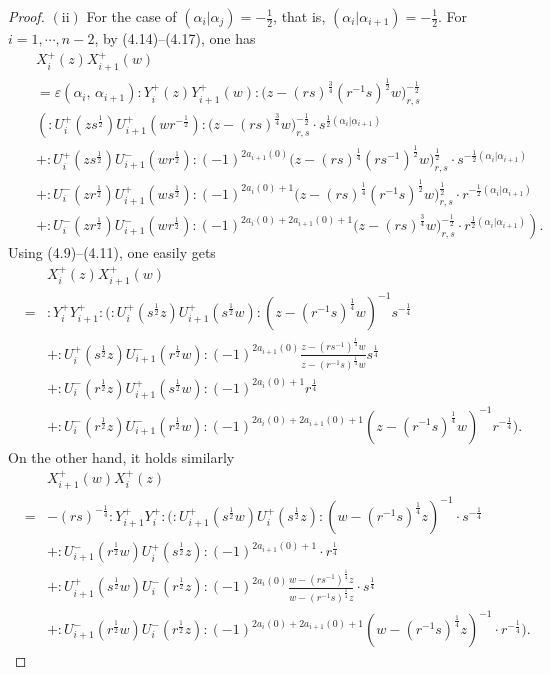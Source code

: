 \documentclass{amsproc}
\theoremstyle{remark}
\numberwithin{equation}{section}
\begin{document}
\begin{proof}
$(\text{ii})$ For the case of $(\alpha_i|\alpha_j)=-\frac{1}{2}$, that is, $(\alpha_i|\alpha_{i+1})=-\frac{1}{2}$.
 For $i=1, \cdots, n-2$, by (4.14)--(4.17), one has
  \begin{eqnarray*}
&&X^+_i(z)X^+_{i+1}(w)\\
&&= \varepsilon(\alpha_{i},\,\alpha_{i+1}):Y_i^+(z)Y_{i+1}^+(w):\big(z-(rs)^{\frac{3}{4}}(r^{-1}s)^{\frac{1}{2}}w\big)_{r,s}^{-\frac{1}{2}}\\
 && \left(:U_i^+(zs^{\frac{1}{2}})U^+_{i+1}(wr^{-\frac{1}{2}}):\big(z-(rs)^{\frac{3}{4}}w\big)_{r,s}^{-\frac{1}{2}}
 \cdot s^{\frac{1}{2}(\alpha_i|\alpha_{i+1})} \right.\\
&& +:U_i^+(zs^{\frac{1}{2}})U_{i+1}^-(wr^{\frac{1}{2}}):(-1)^{2a_{i+1}(0)} \big(z-(rs)^{\frac{1}{4}}(rs^{-1})^{\frac{1}{2}}w\big)_{r,s}^{\frac{1}{2}}\cdot s^{-\frac{1}{2}(\alpha_i|\alpha_{i+1})}\\
 &&  +:U_i^-(zr^{\frac{1}{2}})U_{i+1}^+(ws^{\frac{1}{2}}):(-1)^{2a_{i}(0)+1}
 \big(z-(rs)^{\frac{1}{4}}(r^{-1}s)^{\frac{1}{2}}w\big)_{r,s}^{\frac{1}{2}}\cdot r^{-\frac{1}{2}(\alpha_i|\alpha_{i+1})}\\
&&  \left.+
:U_i^-(zr^{\frac{1}{2}})U_{i+1}^-(wr^{\frac{1}{2}}):(-1)^{2a_i(0)+2a_{i+1}(0)+1}
\big(z-(rs)^{\frac{3}{4}}w\big)_{r,s}^{-\frac{1}{2}}\cdot r^{\frac{1}{2}(\alpha_i|\alpha_{i+1})} \right).
\end{eqnarray*}
Using (4.9)--(4.11), one easily gets
\begin{eqnarray*}
&&X^+_i(z)X^+_{i+1}(w)\\
&=& :Y_i^+Y_{i+1}^+:
\big(:U_i^+(s^{\frac{1}{2}}z)U^+_{i+1}(s^{\frac{1}{2}}w):(z-(r^{-1}s)^{\frac{1}{4}}w)^{-1}s^{-\frac{1}{4}}\\
&&+:U_{i}^+(s^{\frac{1}{2}}z)U_{i+1}^-(r^{\frac{1}{2}}w):(-1)^{2a_{i+1}(0)}
\frac{z-(rs^{-1})^{\frac{1}{4}}w}{z-(r^{-1}s)^{\frac{1}{4}}w}s^{\frac{1}{4}}\\
&&+:U_i^-(r^{\frac{1}{2}}z)U^+_{i+1}(s^{\frac{1}{2}}w):(-1)^{2a_{i}(0)+1}r^{\frac{1}{4}}\\
&&+ :U_i^-(r^{\frac{1}{2}}z)U_{i+1}^-(r^{\frac{1}{2}}w):(-1)^{2a_i(0)+2a_{i+1}(0)+1}
(z-(r^{-1}s)^{\frac{1}{4}}w)^{-1}r^{-\frac{1}{4}}\big).
\end{eqnarray*}
On the other hand, it holds similarly
\begin{eqnarray*}
&&X^+_{i+1}(w)X^+_i(z)\\
&=& -(rs)^{-\frac{1}{4}}:Y_{i+1}^+Y_i^+:
\big(:U^+_{i+1}(s^{\frac{1}{2}}w)U^+_i(s^{\frac{1}{2}}z):(w-(r^{-1}s)^{\frac{1}{4}}z)^{-1}\cdot s^{-\frac{1}{4}}\\
&&+:U_{i+1}^-(r^{\frac{1}{2}}w)U_{i}^+(s^{\frac{1}{2}}z):(-1)^{2a_{i+1}(0)+1}\cdot r^{\frac{1}{4}}\\
&&+:U^+_{i+1}(s^{\frac{1}{2}}w)U_i^-(r^{\frac{1}{2}}z):
(-1)^{2a_{i}(0)}\frac{w-(rs^{-1})^{\frac{1}{4}}z}{w-(r^{-1}s)^{\frac{1}{4}}z}\cdot s^{\frac{1}{4}}\\
&&+ :U_{i+1}^-(r^{\frac{1}{2}}w)U_i^-(r^{\frac{1}{2}}z):(-1)^{2a_i(0)+2a_{i+1}(0)+1}
(w-(r^{-1}s)^{\frac{1}{4}}z)^{-1}\cdot r^{-\frac{1}{4}}\big).
\end{eqnarray*}


\end{proof}
\end{document}
